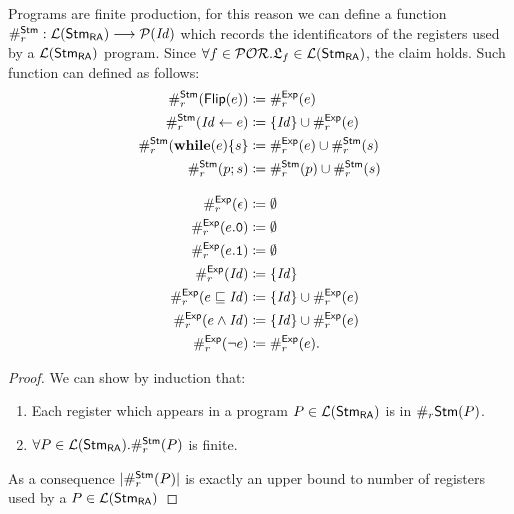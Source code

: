 \begin{defn}
Programs are finite production, for this reason we can define a function
$\#_r^{\mathsf{Stm}}:{\mathcal L ({\mathsf{Stm}_{\mathsf{RA}}})}\longrightarrow \mathcal P(\mathit{Id})$ which records
the identificators of the registers used by a ${\mathcal L ({\mathsf{Stm}_{\mathsf{RA}}})}$ program.
Since $\forall f \in \mathcal{POR}.{\mathfrak L_{f}} \in {\mathcal L ({\mathsf{Stm}_{\mathsf{RA}}})}$, the claim holds.
Such function can defined as follows:
\begin{align*}
\#_r^{\mathsf{Stm}}(\mathsf{Flip(}e\mathsf{)})&\coloneqq \#_r^{\mathsf{Exp}}(e)\\
\#_r^{\mathsf{Stm}}(\mathit{Id}\leftarrow e)&\coloneqq \{\mathit{Id}\}\cup \#_r^{\mathsf{Exp}}(e)\\
\#_r^{\mathsf{Stm}}(\mathbf{while}(e)\{s\}&\coloneqq \#_r^{\mathsf{Exp}}(e)\cup \#_r^{\mathsf{Stm}}(s)\\
\#_r^{\mathsf{Stm}}(p;s)&\coloneqq \#_r^{\mathsf{Stm}}(p)\cup \#_r^{\mathsf{Stm}}(s)\\[2ex]
\#_r^{\mathsf{Exp}}(\epsilon)&\coloneqq \emptyset\\
\#_r^{\mathsf{Exp}}(e.\mathtt{0})&\coloneqq \emptyset\\
\#_r^{\mathsf{Exp}}(e.\mathtt{1})&\coloneqq \emptyset\\
\#_r^{\mathsf{Exp}}(\mathit{Id})&\coloneqq \{\mathit{Id}\}\\
\#_r^{\mathsf{Exp}}(e \sqsubseteq \mathit{Id})&\coloneqq \{\mathit{Id}\}\cup \#_r^{\mathsf{Exp}}(e)\\
\#_r^{\mathsf{Exp}}(e \land \mathit{Id})&\coloneqq \{\mathit{Id}\}\cup \#_r^{\mathsf{Exp}}(e)\\
\#_r^{\mathsf{Exp}}(\lnot e )&\coloneqq \#_r^{\mathsf{Exp}}(e).
\end{align*}
\end{defn}
\noindent
\begin{proof}
We can show by induction that:
\begin{enumerate}
\item Each register which appears in a program $P \in {\mathcal L ({\mathsf{Stm}_{\mathsf{RA}}})}$ is in
$\#_r\mathsf{Stm}(P)$.
\item $\forall P \in {\mathcal L ({\mathsf{Stm}_{\mathsf{RA}}})}. \#_r^{\mathsf{Stm}}(P)$ is finite.
\end{enumerate}
\noindent
As a consequence $|\#_r^{\mathsf{Stm}}(P)|$ is exactly an upper bound to
number of registers used by a $P \in {\mathcal L ({\mathsf{Stm}_{\mathsf{RA}}})}$
\end{proof}



